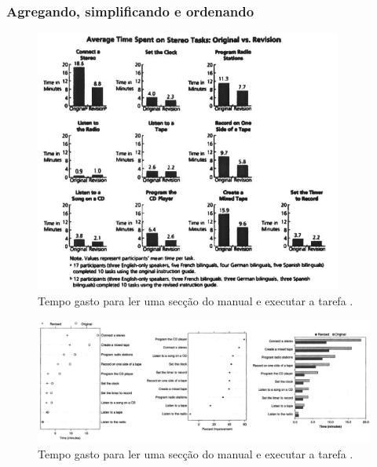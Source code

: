 \begin{frame}[allowframebreaks]
\frametitle{Agregando, simplificando e ordenando}
\begin{figure}[h]
 \centering
  \includegraphics[width=0.9\textwidth,height=0.7\textheight,keepaspectratio]{figures/vcrmanual01.png}
 \caption{Tempo gasto para ler uma secção do manual e executar a tarefa \cite{robbins_creating_2013}.}
 \label{fig-vcrmanual01}
\end{figure}

\framebreak

\begin{figure}[h]
 \centering
  \includegraphics[width=\textwidth,height=0.7\textheight,keepaspectratio]{figures/vcrmanual02.png}
 \caption{Tempo gasto para ler uma secção do manual e executar a tarefa \cite{robbins_creating_2013}.}
 \label{fig-vcrmanual02}
\end{figure}
\end{frame}


